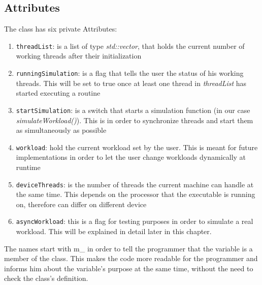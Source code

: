 \subsection{Attributes}
The class has six private Attributes:
\begin{enumerate}
	\item \texttt{threadList}: is a list of type \textit{std::vector}, that holds the current number of working threads after their initialization
	\item \texttt{runningSimulation}: is a flag that tells the user the status of his working threads. This will be set to true once at least one thread in \textit{threadList} has started executing a routine
	\item \texttt{startSimulation}: is a switch that starts a simulation function (in our case \textit{simulateWorkload()}). This is in order to synchronize threads and start them as simultaneously as possible
	\item \texttt{workload}: hold the current workload set by the user. This is meant for future implementations in order to let the user change workloads dynamically at runtime
	\item \texttt{deviceThreads}: is the number of threads the current machine can handle at the same time. This depends on the processor that the executable is running on, therefore can differ on different device
	\item \texttt{asyncWorkload}: this is a flag for testing purposes in order to simulate a \dq real\dq{} workload. This will be explained in detail later in this chapter.
\end{enumerate}
The names start with \dq m\_\dq{} in order to tell the programmer that the variable is a member of the class. This makes the code more readable for the programmer and informs him about the variable's purpose at the same time, without the need to check the class's definition.

